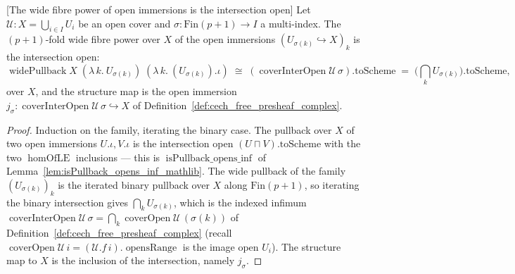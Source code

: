 \begin{lemma}

[The wide fibre power of open immersions is the intersection open]
  \label{lem:widePullback_openImm_inter}
  Let \(\mathcal{U} : X = \bigcup_{i \in I} U_i\) be an open cover and
  \(\sigma : \mathrm{Fin}(p+1) \to I\) a multi-index. The \((p+1)\)-fold wide fibre power over
  \(X\) of the open immersions \((U_{\sigma(k)} \hookrightarrow X)_{k}\) is the intersection open:
  \[
    \operatorname{widePullback} X \;(\lambda\,k.\ U_{\sigma(k)})\;(\lambda\,k.\ (U_{\sigma(k)}).\iota)
      \;\cong\;
    (\operatorname{coverInterOpen}\mathcal{U}\,\sigma).\mathrm{toScheme}
      \;=\; \bigl(\textstyle\bigcap_k U_{\sigma(k)}\bigr).\mathrm{toScheme},
  \]
  over \(X\), and the structure map is the open immersion
  \(j_\sigma : \operatorname{coverInterOpen}\mathcal{U}\,\sigma \hookrightarrow X\) of
  Definition~\ref{def:cech_free_presheaf_complex}.
\end{lemma}
\begin{proof}
  Induction on the family, iterating the binary case. The pullback over \(X\) of two open
  immersions \(U.\iota, V.\iota\) is the intersection open \((U \sqcap V).\mathrm{toScheme}\) with
  the two \(\operatorname{homOfLE}\) inclusions --- this is
  \(\operatorname{isPullback\_opens\_inf}\) of Lemma~\ref{lem:isPullback_opens_inf_mathlib}. The
  wide pullback of the family \((U_{\sigma(k)})_{k}\) is the iterated binary pullback over \(X\)
  along \(\mathrm{Fin}(p+1)\), so iterating the binary intersection gives
  \(\bigcap_k U_{\sigma(k)}\), which is the indexed infimum
  \(\operatorname{coverInterOpen}\mathcal{U}\,\sigma = \bigcap_k \operatorname{coverOpen}
  \mathcal{U}\,(\sigma(k))\) of Definition~\ref{def:cech_free_presheaf_complex} (recall
  \(\operatorname{coverOpen}\mathcal{U}\,i = (\mathcal{U}.f\,i).\operatorname{opensRange}\) is the
  image open \(U_i\)). The structure map to \(X\) is the inclusion of the intersection, namely
  \(j_\sigma\).
\end{proof}

